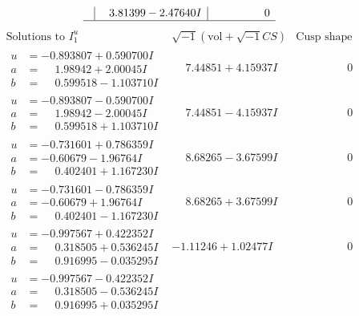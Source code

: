 \documentclass[1p]{elsarticle_modified}
\theoremstyle{definition}
\newcommand{\I}{\sqrt{-1}}
\begin{document}
$$\begin{array}{c|c|c}
 & \phantom{-}3.81399 - 2.47640 I & \phantom{-0.000000 } 0\\
 \hline 
 \end{array}$$\newpage$$\begin{array}{c|c|c}  
\text{Solutions to }I^u_{1}& \I (\text{vol} + \sqrt{-1}CS) & \text{Cusp shape}\\
 \hline 
\begin{aligned}
u &= -0.893807 + 0.590700 I \\
a &= \phantom{-}1.98942 + 2.00045 I \\
b &= \phantom{-}0.599518 - 1.103710 I\end{aligned}
 & \phantom{-}7.44851 + 4.15937 I & \phantom{-0.000000 } 0 \\ \hline\begin{aligned}
u &= -0.893807 - 0.590700 I \\
a &= \phantom{-}1.98942 - 2.00045 I \\
b &= \phantom{-}0.599518 + 1.103710 I\end{aligned}
 & \phantom{-}7.44851 - 4.15937 I & \phantom{-0.000000 } 0 \\ \hline\begin{aligned}
u &= -0.731601 + 0.786359 I \\
a &= -0.60679 - 1.96764 I \\
b &= \phantom{-}0.402401 + 1.167230 I\end{aligned}
 & \phantom{-}8.68265 - 3.67599 I & \phantom{-0.000000 } 0 \\ \hline\begin{aligned}
u &= -0.731601 - 0.786359 I \\
a &= -0.60679 + 1.96764 I \\
b &= \phantom{-}0.402401 - 1.167230 I\end{aligned}
 & \phantom{-}8.68265 + 3.67599 I & \phantom{-0.000000 } 0 \\ \hline\begin{aligned}
u &= -0.997567 + 0.422352 I \\
a &= \phantom{-}0.318505 + 0.536245 I \\
b &= \phantom{-}0.916995 - 0.035295 I\end{aligned}
 & -1.11246 + 1.02477 I & \phantom{-0.000000 } 0 \\ \hline\begin{aligned}
u &= -0.997567 - 0.422352 I \\
a &= \phantom{-}0.318505 - 0.536245 I \\
b &= \phantom{-}0.916995 + 0.035295 I\end{aligned}

\end{array}$$
\end{document}

